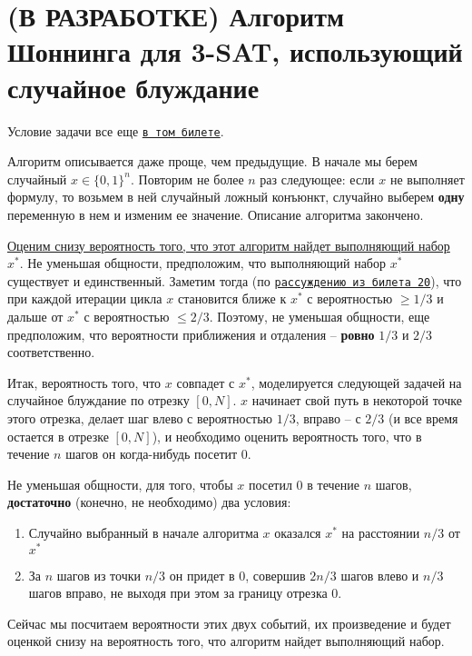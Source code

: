 \section{(В РАЗРАБОТКЕ) Алгоритм Шоннинга для 3-SAT, использующий случайное блуждание}

Условие задачи все еще \hyperlink{3sat}{\texttt{в том билете}}.


Алгоритм описывается даже проще, чем предыдущие. В начале мы берем случайный $x \in \{0, 1\}^n$. Повторим не более $n$ раз следующее: если $x$ не выполняет формулу, то возьмем в ней случайный ложный конъюнкт, случайно выберем \textbf{одну} переменную в нем и изменим ее значение. Описание алгоритма закончено.

\underline{Оценим снизу вероятность того, что этот алгоритм найдет выполняющий набор} $x^*$. Не уменьшая общности, предположим, что выполняющий набор $x^*$ существует и единственный. Заметим тогда (по \hyperlink{flip20}{\texttt{рассуждению из билета 20}}), что при каждой итерации цикла $x$ становится ближе к $x^*$ с вероятностью $\geq 1/3$ и дальше от $x^*$ с вероятностью $\leq 2/3$. Поэтому, не уменьшая общности, еще предположим, что вероятности приближения и отдаления -- \textbf{ровно} $1/3$ и $2/3$ соответственно.

Итак, вероятность того, что $x$ совпадет с $x^*$, моделируется следующей задачей на случайное блуждание по отрезку $[0, N]$. $x$ начинает свой путь в некоторой точке этого отрезка, делает шаг влево с вероятностью $1/3$, вправо -- с $2/3$ (и все время остается в отрезке $[0, N]$), и необходимо оценить вероятность того, что в течение $n$ шагов он когда-нибудь посетит 0.

Не уменьшая общности, для того, чтобы $x$ посетил 0 в течение $n$ шагов, \textbf{достаточно} (конечно, не необходимо) два условия:
\begin{enumerate}
    \item Случайно выбранный в начале алгоритма $x$ оказался $x^*$ на расстоянии $n/3$ от $x^*$
    \item За $n$ шагов из точки $n/3$ он придет в 0, совершив $2n/3$ шагов влево и $n/3$ шагов вправо, не выходя при этом за границу отрезка 0.
\end{enumerate}

Сейчас мы посчитаем вероятности этих двух событий, их произведение и будет оценкой снизу на вероятность того, что алгоритм найдет выполняющий набор.

